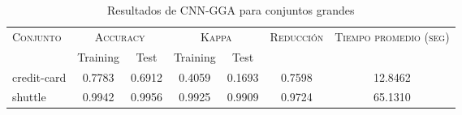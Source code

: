 \begin{table}[]
\centering
\begin{tabular}{l c c c c c c}
\hline
\multirow{2}{*}{\textsc{Conjunto}}
	& \multicolumn{2}{c}{\textsc{Accuracy}}
	& \multicolumn{2}{c}{\textsc{Kappa}}
	& \textsc{Reducción}
	& \textsc{Tiempo promedio (seg)} \\
	& Training & Test
	& Training & Test \\ 
\hline
\hline

credit-card & 0.7783 & 0.6912 & 0.4059 & 0.1693 & 0.7598 & 12.8462 \\
shuttle & 0.9942 & 0.9956 & 0.9925 & 0.9909 & 0.9724 & 65.1310 \\

\hline
\end{tabular}
\caption{Resultados de CNN-GGA para conjuntos grandes }
\label{res-grande-cnn-gga}
\end{table}

